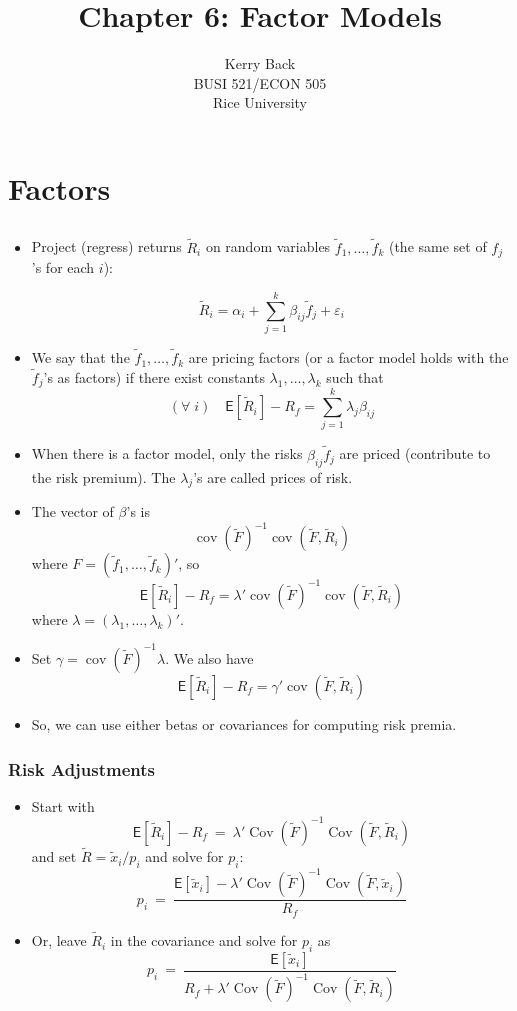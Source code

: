 \documentclass[10pt]{beamer}
\title{Chapter 6: Factor Models}
\date{}
\author{Kerry Back\\ 
BUSI 521/ECON 505\\
Rice University}
\DeclareMathOperator{\cov}{cov}
\DeclareMathOperator{\Cov}{Cov}
\newcommand{\bi}{\begin{itemize}}
\newcommand{\ei}{\end{itemize}}
\newcommand{\im}{\item}
\newcommand{\mye}{\ensuremath{\mathsf{E}}}
\newcommand{\bfr}{\begin{frame}}
\newcommand{\tx}{\tilde{x}}
\newcommand{\tF}{\tilde{F}}
\newcommand{\tf}{\tilde{f}}
\newcommand{\tr}{\widetilde{R}}
\begin{document}
\maketitle




\section{Factors}\subsection{}

\begin{frame}[plain]
    \bi 
    \im Project (regress) returns $\tr_i$ on random variables $\tf_1, \ldots, \tf_k$ (the same set of $f_j$'s for each $i$):

    $$\tr_i = \alpha_i + \sum_{j=1}^k \beta_{ij} \tf_j + \varepsilon_i$$
    \im We say that the $\tf_1, \ldots, \tf_k$ are pricing factors (or a factor model holds with the $\tf_j$'s as factors) if there exist constants $\lambda_1, \ldots, \lambda_k$ such that
    $$(\forall\; i) \quad \mye[\tr_i] - R_f = \sum_{j=1}^k \lambda_j \beta_{ij}$$
    \im When there is a factor model, only the risks $\beta_{ij}\tf_j$ are priced (contribute to the risk premium).  The $\lambda_j$'s are called prices of risk.
    \ei\end{frame}

    \begin{frame}[plain]
        \bi 
    \im The vector of $\beta$'s is
    $$\cov(\tilde F)^{-1} \cov(\tilde F, \tr_i)$$
    where $F = (\tf_1, \ldots, \tf_k)'$, so
    $$\mye[\tr_i] - R_f = \lambda'\cov(\tilde F)^{-1} \cov(\tilde F, \tr_i)$$
    where $\lambda = (\lambda_1, \ldots, \lambda_k)'$.
    \im Set $\gamma = \cov(\tilde F)^{-1}\lambda$.  We also have
    $$\mye[\tr_i] - R_f = \gamma' \cov(\tilde F, \tr_i)$$
    \im So, we can use either betas or covariances for computing risk premia.
\ei 
\end{frame}


\bfr\frametitle{Risk Adjustments}
\bi 
\im Start with 
$$\mye[\tr_i]-R_f \ = \ \lambda' \Cov(\tF)^{-1}\Cov(\tF,\tr_i)$$
and set $\tr = \tx_i/p_i$ and solve for $p_i$:
$$p_i \ = \ \frac{\mye[\tx_i] - \lambda'\Cov(\tF)^{-1}\Cov(\tF,\tx_i)}{R_f}$$

\im Or, leave $\tr_i$ in the covariance and solve for $p_i$ as
$$p_i \ = \ \frac{\mye[\tx_i]}{R_f + \lambda'\Cov(\tF)^{-1}\Cov(\tF,\tr_i)}$$
\ei 
\end{frame}
\end{document}
